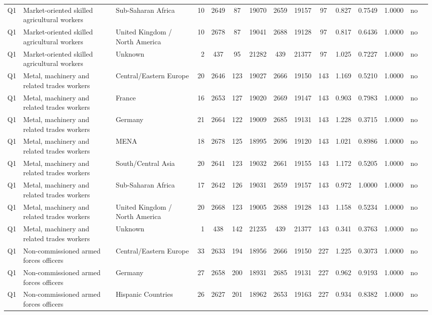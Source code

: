\begin{longtable}{lllrcccccccccll}
Q1 & Market-oriented skilled agricultural workers & Sub-Saharan Africa & 10 & 2649 & 87 & 19070 & 2659 & 19157 & 97 & 0.827 & 0.7549 & 1.0000 & no \\
Q1 & Market-oriented skilled agricultural workers & United Kingdom / North America & 10 & 2678 & 87 & 19041 & 2688 & 19128 & 97 & 0.817 & 0.6436 & 1.0000 & no \\
Q1 & Market-oriented skilled agricultural workers & Unknown & 2 & 437 & 95 & 21282 & 439 & 21377 & 97 & 1.025 & 0.7227 & 1.0000 & no \\
Q1 & Metal, machinery and related trades workers & Central/Eastern Europe & 20 & 2646 & 123 & 19027 & 2666 & 19150 & 143 & 1.169 & 0.5210 & 1.0000 & no \\
Q1 & Metal, machinery and related trades workers & France & 16 & 2653 & 127 & 19020 & 2669 & 19147 & 143 & 0.903 & 0.7983 & 1.0000 & no \\
Q1 & Metal, machinery and related trades workers & Germany & 21 & 2664 & 122 & 19009 & 2685 & 19131 & 143 & 1.228 & 0.3715 & 1.0000 & no \\
Q1 & Metal, machinery and related trades workers & MENA & 18 & 2678 & 125 & 18995 & 2696 & 19120 & 143 & 1.021 & 0.8986 & 1.0000 & no \\
Q1 & Metal, machinery and related trades workers & South/Central Asia & 20 & 2641 & 123 & 19032 & 2661 & 19155 & 143 & 1.172 & 0.5205 & 1.0000 & no \\
Q1 & Metal, machinery and related trades workers & Sub-Saharan Africa & 17 & 2642 & 126 & 19031 & 2659 & 19157 & 143 & 0.972 & 1.0000 & 1.0000 & no \\
Q1 & Metal, machinery and related trades workers & United Kingdom / North America & 20 & 2668 & 123 & 19005 & 2688 & 19128 & 143 & 1.158 & 0.5234 & 1.0000 & no \\
Q1 & Metal, machinery and related trades workers & Unknown & 1 & 438 & 142 & 21235 & 439 & 21377 & 143 & 0.341 & 0.3763 & 1.0000 & no \\
Q1 & Non-commissioned armed forces officers & Central/Eastern Europe & 33 & 2633 & 194 & 18956 & 2666 & 19150 & 227 & 1.225 & 0.3073 & 1.0000 & no \\
Q1 & Non-commissioned armed forces officers & Germany & 27 & 2658 & 200 & 18931 & 2685 & 19131 & 227 & 0.962 & 0.9193 & 1.0000 & no \\
Q1 & Non-commissioned armed forces officers & Hispanic Countries & 26 & 2627 & 201 & 18962 & 2653 & 19163 & 227 & 0.934 & 0.8382 & 1.0000 & no \\

\end{longtable}
